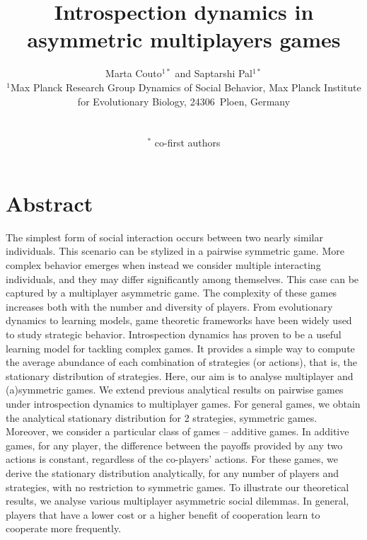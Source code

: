 \documentclass[11pt]{article}
\title{\sffamily \Large {\bfseries Introspection dynamics in asymmetric multiplayers games}}
\date{\empty}
\author{\parbox[c]{16cm}{\centering \onehalfspacing \fontsize{11}{12}\selectfont Marta Couto$^{1*}$ and Saptarshi Pal$^{1*}$\\[0.2cm]
$^1$Max Planck Research Group Dynamics of Social Behavior, Max Planck Institute for Evolutionary Biology, 24306~Ploen, Germany}\\ \\
$^*$ \fontsize{11}{12}\selectfont co-first authors}
\theoremstyle{plainCl1}
\theoremstyle{plainCl2}
\begin{document}
\maketitle
\onehalfspacing
\section*{Abstract}


The simplest form of social interaction occurs between two nearly similar individuals. This scenario can be stylized in a pairwise symmetric game. 
More complex behavior emerges when instead we consider multiple interacting individuals, and they may differ significantly among themselves. This case can be captured by a multiplayer asymmetric game. The complexity of these games increases both with the number and diversity of players.
From evolutionary dynamics to learning models, game theoretic frameworks have been widely used to study strategic behavior. 
Introspection dynamics has proven to be a useful learning model for tackling complex games. 
It provides a simple way to compute the average abundance of each combination of strategies (or actions), that is, the stationary distribution of strategies.
Here, our aim is to analyse multiplayer and (a)symmetric games.
We extend previous analytical results on pairwise games under introspection dynamics to multiplayer games. 
For general games, we obtain the analytical stationary distribution for 2 strategies, symmetric games.
Moreover, we consider a particular class of games -- additive games. 
In additive games, for any player, the difference between the payoffs provided by any two actions is constant, regardless of the co-players' actions. 
For these games, we derive the stationary distribution analytically, for any number of players and strategies, with no restriction to symmetric games. 
To illustrate our theoretical results, we analyse various multiplayer asymmetric social dilemmas. 
In general, players that have a lower cost or a higher benefit of cooperation learn to cooperate more frequently.

\end{document}
